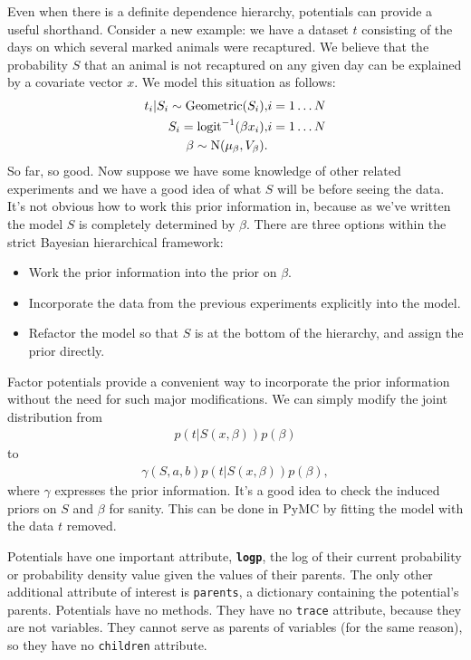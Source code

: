 Even when there is a definite dependence hierarchy, potentials can provide a useful shorthand. Consider a new example: we have a dataset $t$ consisting of the days on which several marked animals were recaptured. We believe that the probability $S$ that an animal is not recaptured on any given day can be explained by a covariate vector $x$. We model this situation as follows:
\begin{eqnarray*}
    t_i|S_i \sim \textup{Geometric}(S_i), & i=1\ldots N\\
    S_i = \textup{logit}^{-1}(\beta x_i), &i=1\ldots N\\
    \beta\sim \textup{N}(\mu_\beta, V_\beta).
\end{eqnarray*}
So far, so good. Now suppose we have some knowledge of other related experiments and we have a good idea of what $S$ will be before seeing the data. It's not obvious how to work this prior information in, because as we've written the model $S$ is completely determined by $\beta$. There are three options within the strict Bayesian hierarchical framework:
\begin{itemize}
    \item Work the prior information into the prior on $\beta$.
    \item Incorporate the data from the previous experiments explicitly into the model.
    \item Refactor the model so that $S$ is at the bottom of the hierarchy, and assign the prior directly.
\end{itemize}

Factor potentials provide a convenient way to incorporate the prior information without the need for such major modifications. We can simply modify the joint distribution from
\begin{eqnarray*}
    p(t|S(x,\beta)) p(\beta)
\end{eqnarray*}
to
\begin{eqnarray*}
    \gamma(S,a,b) p(t|S(x,\beta)) p(\beta),
\end{eqnarray*}
where $\gamma$ expresses the prior information. It's a good idea to check the induced priors on $S$ and $\beta$ for sanity. This can be done in PyMC by fitting the model with the data $t$ removed.

\bigskip
Potentials have one important attribute, \texttt{\bfseries logp}, the log of their current probability or probability density value given the values of their parents. The only other additional attribute of interest is \texttt{parents}, a dictionary containing the potential's parents. Potentials have no methods. They have no \texttt{trace} attribute, because they are not variables. They cannot serve as parents of variables (for the same reason), so they have no \texttt{children} attribute.


